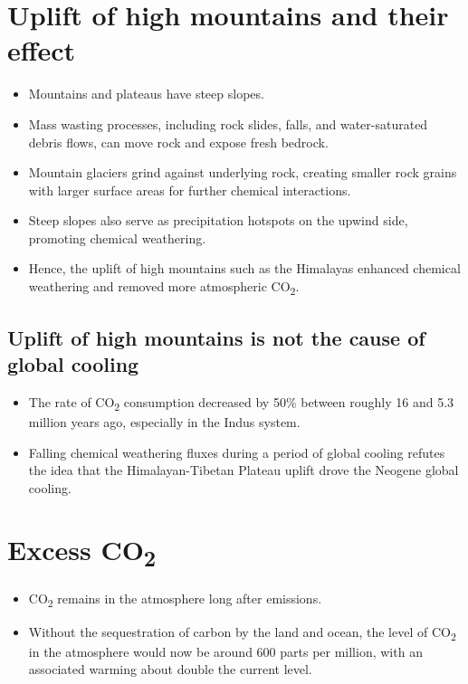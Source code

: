 \documentclass[11pt]{article}
\begin{document}
\section{Uplift of high mountains and their effect}
\label{sec:orgb6bcb11}
\begin{itemize}
\item Mountains and plateaus have steep slopes.
\item Mass wasting processes, including rock slides, falls, and water-saturated debris flows, can move rock and expose fresh bedrock.
\item Mountain glaciers grind against underlying rock, creating smaller rock grains with larger surface areas for further chemical interactions.
\item Steep slopes also serve as precipitation hotspots on the upwind side, promoting chemical weathering.
\item Hence, the uplift of high mountains such as the Himalayas enhanced chemical weathering and removed more atmospheric CO\textsubscript{2}.
\end{itemize}

\subsection{Uplift of high mountains is not the cause of global cooling}
\label{sec:org7e3be25}
\begin{itemize}
\item The rate of CO\textsubscript{2} consumption decreased by 50\% between roughly 16 and 5.3 million years ago, especially in the Indus system.
\item Falling chemical weathering fluxes during a period of global cooling refutes the idea that the Himalayan-Tibetan Plateau uplift drove the Neogene global cooling.
\end{itemize}


\section{Excess CO\textsubscript{2}}
\label{sec:orgcf8815a}
\begin{itemize}
\item CO\textsubscript{2} remains in the atmosphere long after emissions.
\item Without the sequestration of carbon by the land and ocean, the level of CO\textsubscript{2} in the atmosphere would now be around 600 parts per million, with an associated warming about double the current level.
\end{itemize}
\end{document}
